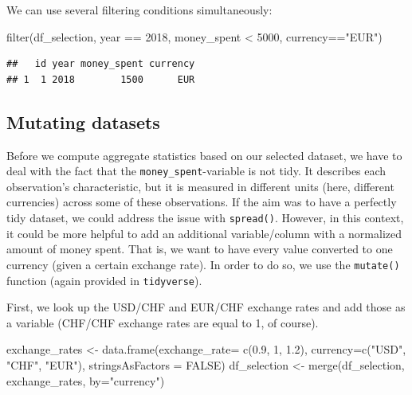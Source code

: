 \documentclass[
  12pt,
]{style/krantz}
\newenvironment{Shaded}{\begin{snugshade}}{\end{snugshade}}
\newcommand{\AttributeTok}[1]{\textcolor[rgb]{0.77,0.63,0.00}{#1}}
\newcommand{\ConstantTok}[1]{\textcolor[rgb]{0.00,0.00,0.00}{#1}}
\newcommand{\DecValTok}[1]{\textcolor[rgb]{0.00,0.00,0.81}{#1}}
\newcommand{\FloatTok}[1]{\textcolor[rgb]{0.00,0.00,0.81}{#1}}
\newcommand{\FunctionTok}[1]{\textcolor[rgb]{0.00,0.00,0.00}{#1}}
\newcommand{\NormalTok}[1]{#1}
\newcommand{\OtherTok}[1]{\textcolor[rgb]{0.56,0.35,0.01}{#1}}
\newcommand{\SpecialCharTok}[1]{\textcolor[rgb]{0.00,0.00,0.00}{#1}}
\newcommand{\StringTok}[1]{\textcolor[rgb]{0.31,0.60,0.02}{#1}}
\begin{document}
We can use several filtering conditions simultaneously:

\begin{Shaded}
\begin{Highlighting}[]
\FunctionTok{filter}\NormalTok{(df\_selection, year }\SpecialCharTok{==} \DecValTok{2018}\NormalTok{, money\_spent }\SpecialCharTok{\textless{}} \DecValTok{5000}\NormalTok{, currency}\SpecialCharTok{==}\StringTok{"EUR"}\NormalTok{)}
\end{Highlighting}
\end{Shaded}

\begin{verbatim}
##   id year money_spent currency
## 1  1 2018        1500      EUR
\end{verbatim}

\hypertarget{mutating-datasets}{%
\subsection{Mutating datasets}\label{mutating-datasets}}

Before we compute aggregate statistics based on our selected dataset, we have to deal with the fact that the \texttt{money\_spent}-variable is not tidy. It describes each observation's characteristic, but it is measured in different units (here, different currencies) across some of these observations. If the aim was to have a perfectly tidy dataset, we could address the issue with \texttt{spread()}. However, in this context, it could be more helpful to add an additional variable/column with a normalized amount of money spent. That is, we want to have every value converted to one currency (given a certain exchange rate). In order to do so, we use the \texttt{mutate()} function (again provided in \texttt{tidyverse}).

First, we look up the USD/CHF and EUR/CHF exchange rates and add those as a variable (CHF/CHF exchange rates are equal to 1, of course).

\begin{Shaded}
\begin{Highlighting}[]
\NormalTok{exchange\_rates }\OtherTok{\textless{}{-}} \FunctionTok{data.frame}\NormalTok{(}\AttributeTok{exchange\_rate=} \FunctionTok{c}\NormalTok{(}\FloatTok{0.9}\NormalTok{, }\DecValTok{1}\NormalTok{, }\FloatTok{1.2}\NormalTok{),}
                             \AttributeTok{currency=}\FunctionTok{c}\NormalTok{(}\StringTok{"USD"}\NormalTok{, }\StringTok{"CHF"}\NormalTok{, }\StringTok{"EUR"}\NormalTok{), }\AttributeTok{stringsAsFactors =} \ConstantTok{FALSE}\NormalTok{)}
\NormalTok{df\_selection }\OtherTok{\textless{}{-}} \FunctionTok{merge}\NormalTok{(df\_selection, exchange\_rates, }\AttributeTok{by=}\StringTok{"currency"}\NormalTok{)}
\end{Highlighting}
\end{Shaded}
\end{document}
